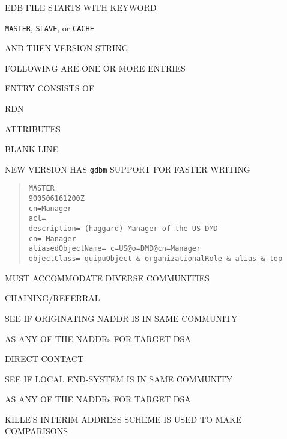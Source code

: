 \begin{bwslide}

\begin{nrtc}
\item	EDB FILE STARTS WITH KEYWORD
    \begin{nrtc}
    \item	\verb"MASTER", \verb"SLAVE", or \verb"CACHE"
    \end{nrtc}
    AND THEN VERSION STRING

\item	FOLLOWING ARE ONE OR MORE ENTRIES

\item	ENTRY CONSISTS OF
    \begin{nrtc}
    \item	RDN

    \item	ATTRIBUTES

    \item	BLANK LINE
    \end{nrtc}

\item	NEW VERSION HAS \verb"gdbm" SUPPORT FOR FASTER WRITING
\end{nrtc}
\end{bwslide}


\begin{bwslide}

\begin{quote}\small\begin{verbatim}
MASTER
900506161200Z
cn=Manager
acl=
description= (haggard) Manager of the US DMD
cn= Manager
aliasedObjectName= c=US@o=DMD@cn=Manager
objectClass= quipuObject & organizationalRole & alias & top
\end{verbatim}\end{quote}
\end{bwslide}


\begin{bwslide}

\begin{nrtc}
\item	MUST ACCOMMODATE DIVERSE COMMUNITIES

\item	CHAINING/REFERRAL
    \begin{nrtc}
    \item	SEE IF ORIGINATING NADDR IS IN SAME COMMUNITY
    \end{nrtc}
    AS ANY OF THE NADDRs FOR TARGET DSA

\item	DIRECT CONTACT
    \begin{nrtc}
    \item	SEE IF LOCAL END-SYSTEM IS IN SAME COMMUNITY
    \end{nrtc}
    AS ANY OF THE NADDRs FOR TARGET DSA

\item	KILLE'S INTERIM ADDRESS SCHEME IS USED TO MAKE COMPARISONS
\end{nrtc}
\end{bwslide}


